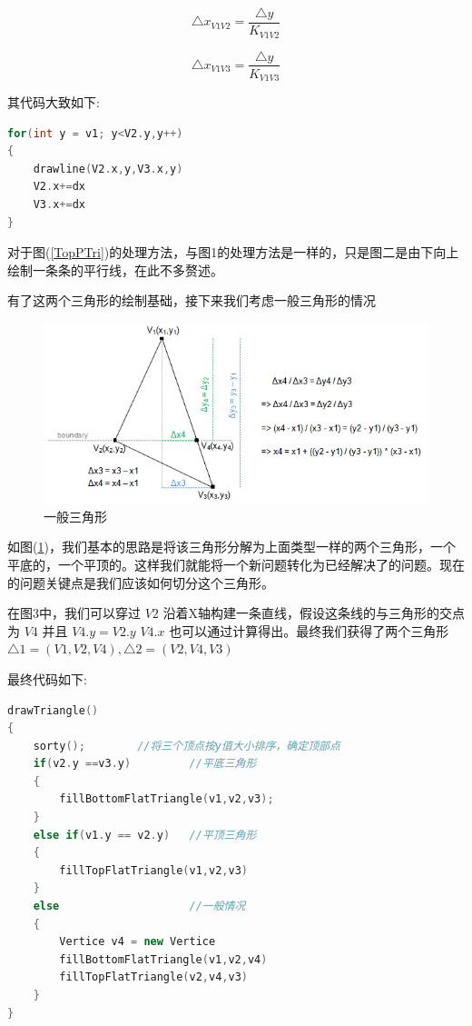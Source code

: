 \documentclass[12pt,oneside,a4paper]{ctexart}
\begin{document}
\begin{equation*}
	\triangle x_{V1V2} = \frac{\triangle y}{K_{V1V2}}
\end{equation*}

\begin{equation*}
	\triangle x_{V1V3} = \frac{\triangle y}{K_{V1V3}}
\end{equation*}

其代码大致如下:
\newline
\begin{lstlisting}[language=c++]
for(int y = v1; y<V2.y,y++)
{
	drawline(V2.x,y,V3.x,y)
	V2.x+=dx
	V3.x+=dx
}
\end{lstlisting}

对于图(\ref{TopPTri})的处理方法，与图1的处理方法是一样的，只是图二是由下向上绘制一条条的平行线，在此不多赘述。

有了这两个三角形的绘制基础，接下来我们考虑一般三角形的情况
\begin{figure}[H]
	\centering
	\includegraphics[scale=0.7]{Picture/latex4.3.png}
	\vspace{-2ex}
	\caption{一般三角形}
	\label{NormalTri}
\end{figure}

如图(\ref{NormalTri})，我们基本的思路是将该三角形分解为上面类型一样的两个三角形，一个平底的，一个平顶的。这样我们就能将一个新问题转化为已经解决了的问题。现在的问题关键点是我们应该如何切分这个三角形。

在图3中，我们可以穿过 $V2$ 沿着X轴构建一条直线，假设这条线的与三角形的交点为 $V4$ 并且 $V4.y=V2.y$ $V4.x$ 也可以通过计算得出。最终我们获得了两个三角形 $\triangle{1} = (V1,V2,V4),\triangle{2} = (V2,V4,V3)$

最终代码如下:
\newline
\begin{lstlisting}[language=c++]
drawTriangle()
{
	sorty();		//将三个顶点按y值大小排序，确定顶部点
	if(v2.y ==v3.y)			//平底三角形
	{
		fillBottomFlatTriangle(v1,v2,v3);
	}
	else if(v1.y == v2.y)	//平顶三角形
	{
		fillTopFlatTriangle(v1,v2,v3)
	}
	else					//一般情况
	{
		Vertice v4 = new Vertice
		fillBottomFlatTriangle(v1,v2,v4)
		fillTopFlatTriangle(v2,v4,v3)
	}
}
\end{lstlisting}
\end{document}
